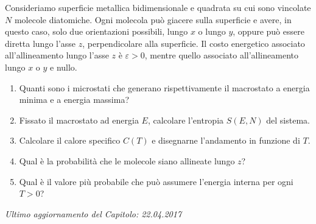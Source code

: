 \begin{Exercise}[title={Particelle diatomiche},label={ex:04-diatom}]
 Consideriamo superficie metallica bidimensionale e quadrata su cui sono vincolate $N$ molecole diatomiche. Ogni molecola può giacere sulla superficie e avere, in questo caso, solo due orientazioni possibili, lungo $x$ o lungo $y$, oppure può essere diretta lungo l'asse $z$, perpendicolare alla superficie. Il costo energetico associato all'allineamento lungo l'asse $z$ è $\varepsilon > 0$,  mentre quello associato all'allineamento lungo $x$ o $y$ e nullo.
\begin{enumerate}
\item Quanti sono i microstati che generano rispettivamente il macrostato a energia minima e a energia massima?
\item  Fissato il macrostato ad energia $E$, calcolare l'entropia $S(E, N )$ del sistema.
\item Calcolare il calore specifico $C(T )$ e disegnarne l'andamento in funzione di $T$.
\item Qual è la probabilità che le molecole siano allineate lungo $z$?
\item Qual è il valore più probabile che può assumere l'energia interna per ogni $T>0$?
\end{enumerate}

\end{Exercise}


\vskip 0.75cm
\begin{flushright}
{\em Ultimo aggiornamento del Capitolo: 22.04.2017}
\end{flushright}

